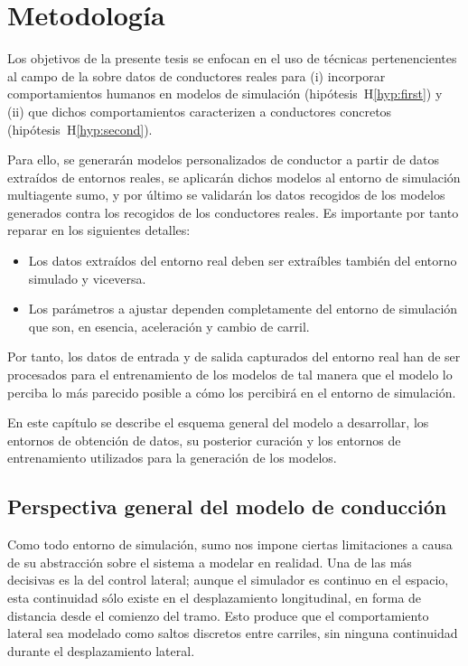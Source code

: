 \chapter{Metodología}
\label{ch:methodology}

Los objetivos de la presente tesis se enfocan en el uso de técnicas pertenencientes al campo de la  sobre datos de conductores reales para (i) incorporar comportamientos humanos en modelos de simulación (hipótesis~H\ref{hyp:first}) y (ii) que dichos comportamientos caracterizen a conductores concretos (hipótesis~H\ref{hyp:second}).

Para ello, se generarán modelos personalizados de conductor a partir de datos extraídos de entornos reales, se aplicarán dichos modelos al entorno de simulación multiagente \gls{sumo}, y por último se validarán los datos recogidos de los modelos generados contra los recogidos de los conductores reales. Es importante por tanto reparar en los siguientes detalles:

\begin{itemize}
	\item Los datos extraídos del entorno real deben ser extraíbles también del entorno simulado y viceversa. 
	\item Los parámetros a ajustar dependen completamente del entorno de simulación que son, en esencia, aceleración y cambio de carril.
\end{itemize}

Por tanto, los datos de entrada y de salida capturados del entorno real han de ser procesados para el entrenamiento de los modelos de tal manera que el modelo lo perciba lo más parecido posible a cómo los percibirá en el entorno de simulación.

En este capítulo se describe el esquema general del modelo a desarrollar, los entornos de obtención de datos, su posterior curación y los entornos de entrenamiento utilizados para la generación de los modelos.

\section{Perspectiva general del modelo de conducción}

Como todo entorno de simulación, \gls{sumo} nos impone ciertas limitaciones a causa de su abstracción sobre el sistema a modelar en realidad. Una de las más decisivas es la del control lateral; aunque el simulador es continuo en el espacio, esta continuidad sólo existe en el desplazamiento longitudinal, en forma de distancia desde el comienzo del tramo. Esto produce que el comportamiento lateral sea modelado como saltos discretos entre carriles, sin ninguna continuidad durante el desplazamiento lateral.


